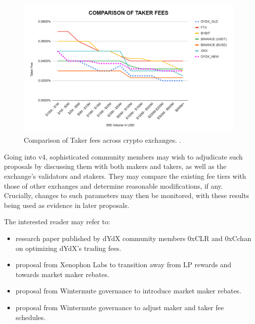             \begin{figure}[htp]
                \centering
                \includegraphics[width=0.7\linewidth]{figs/fee_comp_takers.png}
                \caption{Comparison of Taker fees across crypto exchanges. .}
                \label{fig:fee_comp_takers}
            \end{figure}

            Going into v4, sophisticated community members may wish to adjudicate such proposals by discussing them with both makers and takers, as well as the exchange's validators and stakers. They may compare the existing fee tiers with those of other exchanges and determine reasonable modifications, if any. Crucially, changes to such parameters may then be monitored, with these results being used as evidence in later proposals. 
            
            The interested reader may refer to:
            \begin{itemize}
                \item {} research paper published by dYdX community members 0xCLR and 0xCchan on optimizing dYdX's trading fees.
                \item {} proposal from Xenophon Labs to transition away from LP rewards and towards market maker rebates.
                \item {} proposal from Wintermute governance to introduce market maker rebates.
                \item {} proposal from Wintermute governance to adjust maker and taker fee schedules.
            \end{itemize}

